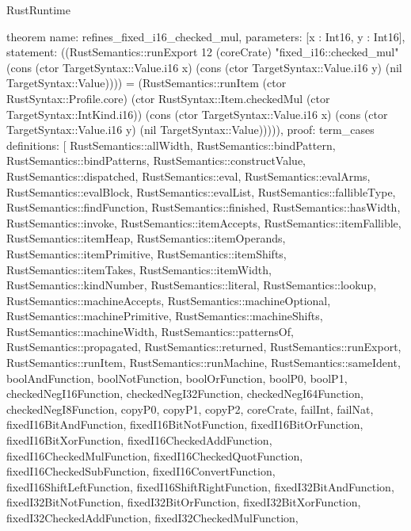 \begin{lexlean}{RustRuntime}
\begin{semanticmodule}
theorem{
  name: refines_fixed_i16_checked_mul,
  parameters: [x : Int16, y : Int16],
  statement: ((RustSemantics::runExport 12 (coreCrate) "fixed_i16::checked_mul" (cons (ctor TargetSyntax::Value.i16 x) (cons (ctor TargetSyntax::Value.i16 y) (nil TargetSyntax::Value)))) = (RustSemantics::runItem (ctor RustSyntax::Profile.core) (ctor RustSyntax::Item.checkedMul (ctor TargetSyntax::IntKind.i16)) (cons (ctor TargetSyntax::Value.i16 x) (cons (ctor TargetSyntax::Value.i16 y) (nil TargetSyntax::Value))))),
  proof: term_cases{
    definitions: [
      RustSemantics::allWidth,
      RustSemantics::bindPattern,
      RustSemantics::bindPatterns,
      RustSemantics::constructValue,
      RustSemantics::dispatched,
      RustSemantics::eval,
      RustSemantics::evalArms,
      RustSemantics::evalBlock,
      RustSemantics::evalList,
      RustSemantics::fallibleType,
      RustSemantics::findFunction,
      RustSemantics::finished,
      RustSemantics::hasWidth,
      RustSemantics::invoke,
      RustSemantics::itemAccepts,
      RustSemantics::itemFallible,
      RustSemantics::itemHeap,
      RustSemantics::itemOperands,
      RustSemantics::itemPrimitive,
      RustSemantics::itemShifts,
      RustSemantics::itemTakes,
      RustSemantics::itemWidth,
      RustSemantics::kindNumber,
      RustSemantics::literal,
      RustSemantics::lookup,
      RustSemantics::machineAccepts,
      RustSemantics::machineOptional,
      RustSemantics::machinePrimitive,
      RustSemantics::machineShifts,
      RustSemantics::machineWidth,
      RustSemantics::patternsOf,
      RustSemantics::propagated,
      RustSemantics::returned,
      RustSemantics::runExport,
      RustSemantics::runItem,
      RustSemantics::runMachine,
      RustSemantics::sameIdent,
      boolAndFunction,
      boolNotFunction,
      boolOrFunction,
      boolP0,
      boolP1,
      checkedNegI16Function,
      checkedNegI32Function,
      checkedNegI64Function,
      checkedNegI8Function,
      copyP0,
      copyP1,
      copyP2,
      coreCrate,
      failInt,
      failNat,
      fixedI16BitAndFunction,
      fixedI16BitNotFunction,
      fixedI16BitOrFunction,
      fixedI16BitXorFunction,
      fixedI16CheckedAddFunction,
      fixedI16CheckedMulFunction,
      fixedI16CheckedQuotFunction,
      fixedI16CheckedSubFunction,
      fixedI16ConvertFunction,
      fixedI16ShiftLeftFunction,
      fixedI16ShiftRightFunction,
      fixedI32BitAndFunction,
      fixedI32BitNotFunction,
      fixedI32BitOrFunction,
      fixedI32BitXorFunction,
      fixedI32CheckedAddFunction,
      fixedI32CheckedMulFunction,
}}
\end{semanticmodule}
\end{lexlean}
